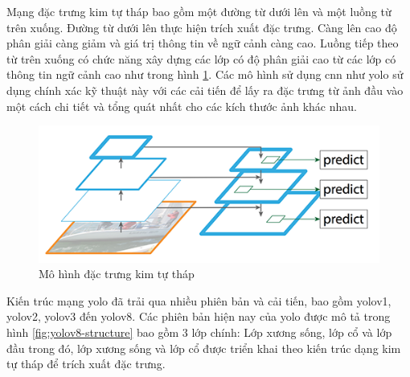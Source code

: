 Mạng đặc trưng kim tự tháp bao gồm một đường từ dưới lên và một luồng từ trên xuống. Đường từ dưới lên thực hiện trích xuất đặc trưng. Càng lên cao độ phân giải càng giảm và giá trị thông tin về ngữ cảnh càng cao. Luồng tiếp theo từ trên xuống có chức năng xây dựng các lớp có độ phân giải cao từ các lớp có thông tin ngữ cảnh cao như trong hình \ref{fig:fpn}. Các mô hình sử dụng \acrshort{cnn} như \acrshort{yolo} sử dụng chính xác kỹ thuật này với các cải tiến để lấy ra đặc trưng từ ảnh đầu vào một cách chi tiết và tổng quát nhất cho các kích thước ảnh khác nhau.

\begin{figure}[h]
	\centering
	\includegraphics[width=0.8\linewidth]{images/fpn}
	\caption{Mô hình đặc trưng kim tự tháp}
	\label{fig:fpn}
\end{figure}

Kiến trúc mạng \acrshort{yolo} đã trải qua nhiều phiên bản và cải tiến, bao gồm \acrshort{yolo}v1, \acrshort{yolo}v2, \acrshort{yolo}v3 đến \acrshort{yolo}v8. Các phiên bản hiện nay của \acrshort{yolo} được mô tả trong hình \ref{fig:yolov8-structure} bao gồm 3 lớp chính: Lớp xương sống, lớp cổ và lớp đầu trong đó, lớp xương sống và lớp cổ được triển khai theo kiến trúc dạng kim tự tháp để trích xuất đặc trưng.

